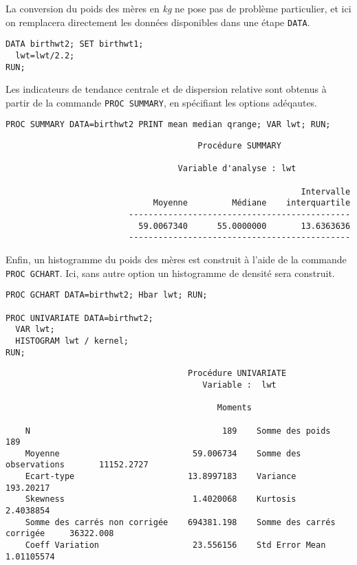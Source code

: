 La conversion du poids des mères en \emph{kg} ne pose pas de problème
particulier, et ici on remplacera directement les données disponibles dans
une étape \texttt{DATA}.
\begin{verbatim}
DATA birthwt2; SET birthwt1;
  lwt=lwt/2.2; 
RUN;
\end{verbatim}

Les indicateurs de tendance centrale et de dispersion relative sont obtenus
à partir de la commande \texttt{PROC SUMMARY}, en spécifiant les options
adéqautes. 
\begin{verbatim}
PROC SUMMARY DATA=birthwt2 PRINT mean median qrange; VAR lwt; RUN;
\end{verbatim}

\begin{verbatim}
                                       Procédure SUMMARY

                                   Variable d'analyse : lwt

                                                            Intervalle
                              Moyenne         Médiane    interquartile
                         ---------------------------------------------
                           59.0067340      55.0000000       13.6363636
                         ---------------------------------------------
\end{verbatim}

Enfin, un histogramme du poids des mères est construit à l'aide de la
commande \texttt{PROC GCHART}. Ici, sans autre option un histogramme de
densité sera construit.
\begin{verbatim}
PROC GCHART DATA=birthwt2; Hbar lwt; RUN;

PROC UNIVARIATE DATA=birthwt2;
  VAR lwt;
  HISTOGRAM lwt / kernel;
RUN;
\end{verbatim}

\begin{verbatim}
                                     Procédure UNIVARIATE
                                        Variable :  lwt

                                           Moments

    N                                       189    Somme des poids                     189
    Moyenne                           59.006734    Somme des observations       11152.2727
    Ecart-type                       13.8997183    Variance                      193.20217
    Skewness                          1.4020068    Kurtosis                      2.4038854
    Somme des carrés non corrigée    694381.198    Somme des carrés corrigée     36322.008
    Coeff Variation                   23.556156    Std Error Mean               1.01105574
\end{verbatim}

